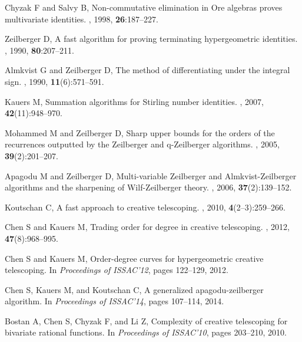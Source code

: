 \documentclass{jssc}
\begin{document}
\begin{thebibliography}{100}
Chyzak F and Salvy B,
\newblock Non-commutative elimination in {O}re algebras proves multivariate
  identities.
, 1998, {\bf 26}:187--227.

Zeilberger D,
\newblock A fast algorithm for proving terminating hypergeometric identities.
, 1990, {\bf 80}:207--211.

Almkvist G and Zeilberger D,
\newblock The method of differentiating under the integral sign.
, 1990, {\bf 11}(6):571--591.

Kauers M,
\newblock Summation algorithms for {S}tirling number identities.
, 2007, {\bf 42}(11):948--970.

Mohammed M and  Zeilberger D,
\newblock Sharp upper bounds for the orders of the recurrences outputted by the
  {Z}eilberger and q-{Z}eilberger algorithms.
, 2005, {\bf 39}(2):201--207.

Apagodu M and Zeilberger D,
\newblock Multi-variable {Z}eilberger and {A}lmkvist-{Z}eilberger algorithms
  and the sharpening of {W}ilf-{Z}eilberger theory.
, 2006, {\bf 37}(2):139--152.

Koutschan C,
\newblock A fast approach to creative telescoping.
, 2010, {\bf 4}(2--3):259--266.

Chen S and  Kauers M,
\newblock Trading order for degree in creative telescoping.
, 2012, {\bf 47}(8):968--995.

Chen S and  Kauers M,
\newblock Order-degree curves for hypergeometric creative telescoping.
\newblock In {\it Proceedings of ISSAC'12}, pages 122--129, 2012.

Chen S, Kauers M, and Koutschan C,
\newblock A generalized apagodu-zeilberger algorithm.
\newblock In {\it Proceedings of ISSAC'14}, pages 107--114, 2014.

Bostan A, Chen S, Chyzak F, and Li Z,
\newblock Complexity of creative telescoping for bivariate rational functions.
\newblock In {\it Proceedings of ISSAC'10}, pages 203--210, 2010.


\end{thebibliography}
\end{document}
